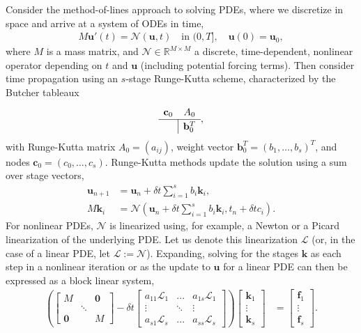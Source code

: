 \documentclass[a4paper,10pt]{article}
\begin{document}
Consider the method-of-lines approach to solving PDEs, where we discretize in space and arrive
at a system of ODEs in time,
%
\begin{align}\label{eq:problem}
	M\mathbf{u}'(t) =  \mathcal{N}(\mathbf{u},t) \quad\text{in }(0,T], \quad \mathbf{u}(0) = \mathbf{u}_0,
\end{align}
%
where $M$ is a mass matrix, and $\mathcal{N}\in\mathbb{R}^{M\times M}$ a discrete, time-dependent, nonlinear
operator depending on $t$ and $\mathbf{u}$ (including potential forcing terms).
Then consider time propagation using an $s$-stage
Runge-Kutta scheme, characterized by the Butcher tableaux 
%
\begin{align*}
	\renewcommand\arraystretch{1.2}
	\begin{array}
	{c|c}
	\mathbf{c}_0 & A_0\\
	\hline
	& \mathbf{b}_0^T
	\end{array},
\end{align*}
%
with Runge-Kutta matrix $A_0 = (a_{ij})$, weight vector $\mathbf{b}_0^T = (b_1, \ldots, b_s)^T$, and 
nodes $\mathbf{c}_0 = (c_0, \ldots, c_s)$.
Runge-Kutta methods update the solution using a sum over stage vectors,
%
\begin{align*}
\mathbf{u}_{n+1} & = \mathbf{u}_n + \delta t \sum_{i=1}^s b_i\mathbf{k}_i, \\
M\mathbf{k}_i & = \mathcal{N}\left(\mathbf{u}_n + \delta t\sum_{i=1}^s b_i\mathbf{k}_i, t_n+\delta tc_i\right).
\end{align*}
%
For nonlinear PDEs, $\mathcal{N}$ is linearized using, for example, a Newton or a Picard
linearization of the underlying PDE. Let us denote this linearization $\mathcal{L}$ (or, 
in the case of a linear PDE, let $\mathcal{L} := \mathcal{N}$).
Expanding, solving for the stages $\mathbf{k}$ as each step in a nonlinear iteration or
as the update to $\mathbf{u}$ for a linear PDE can then be expressed as a block linear system,
%
\begin{align}\label{eq:k0}
\left( \begin{bmatrix} M  & & \mathbf{0} \\ & \ddots \\ \mathbf{0} & & M\end{bmatrix}
	- \delta t \begin{bmatrix} a_{11}\mathcal{L}_1 & ... & a_{1s}\mathcal{L}_1 \\
	\vdots & \ddots & \vdots \\ a_{s1}\mathcal{L}_s & ... & a_{ss} \mathcal{L}_s \end{bmatrix} \right)
	\begin{bmatrix} \mathbf{k}_1 \\ \vdots \\ \mathbf{k}_s \end{bmatrix} 
& = \begin{bmatrix} \mathbf{f}_1 \\ \vdots \\ \mathbf{f}_s \end{bmatrix}.
\end{align}
%
\end{document}
